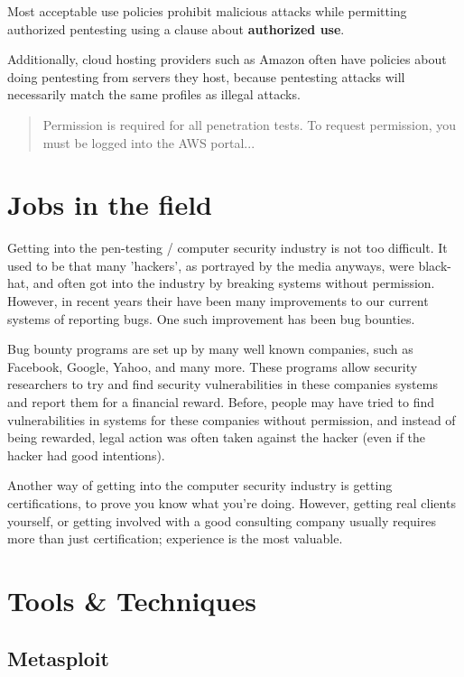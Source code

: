\documentclass{report}
\begin{document}
Most acceptable use policies prohibit malicious attacks while permitting
authorized pentesting using a clause about {\bf authorized use}. 

Additionally, cloud hosting providers such as Amazon often have policies about
doing pentesting from servers they host, because pentesting attacks will
necessarily match the same profiles as illegal attacks\cite{aws}. 

\begin{quote}
    Permission is required for all penetration tests.
    To request permission, you must be logged into the AWS portal...
\end{quote}



\section*{Jobs in the field} 

Getting into the pen-testing / computer security industry is not too difficult.
It used to be that many 'hackers', as portrayed by the media anyways, were
black-hat, and often got into the industry by breaking systems without 
permission. However, in recent years their have been many improvements to our
current systems of reporting bugs. One such improvement has been bug bounties.

Bug bounty programs are set up by many well known companies, such as Facebook,
Google, Yahoo, and many more. These programs allow security researchers to try
and find security vulnerabilities in these companies systems and report them
for a financial reward. Before, people may have tried to find vulnerabilities
in systems for these companies without permission, and instead of being
rewarded, legal action was often taken against the hacker (even if the hacker
had good intentions). 

Another way of getting into the computer security industry is getting 
certifications, to prove you know what you're doing. However, getting real
clients yourself, or getting involved with a good consulting company usually
requires more than just certification; experience is the most valuable.

\section*{Tools \& Techniques}

\subsection*{Metasploit}
\end{document}
